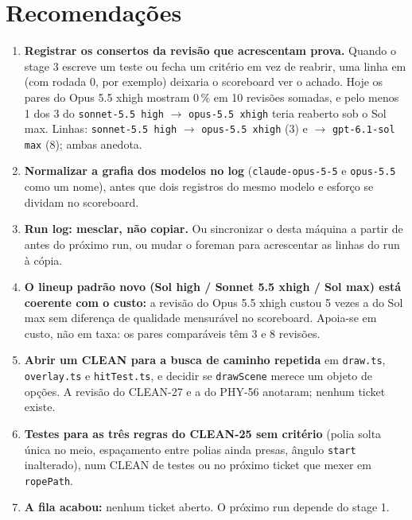 \documentclass[11pt,a4paper]{article}
\begin{document}
\section{Recomendações}
\begin{enumerate}
  \item \textbf{Registrar os consertos da revisão que acrescentam prova.}
        Quando o stage 3 escreve um teste ou fecha um critério em vez de
        reabrir, uma linha em  (com rodada 0, por
        exemplo) deixaria o scoreboard ver o achado. Hoje os pares do Opus 5.5
        xhigh mostram 0\,\% em 10 revisões somadas, e pelo menos 1 dos 3 do
        \texttt{sonnet-5.5 high} $\to$ \texttt{opus-5.5 xhigh} teria reaberto
        sob o Sol max. Linhas: \texttt{sonnet-5.5 high} $\to$
        \texttt{opus-5.5 xhigh} (3) e $\to$ \texttt{gpt-6.1-sol max} (8);
        ambas anedota.
  \item \textbf{Normalizar a grafia dos modelos no log} (\texttt{claude-opus-5-5}
        e \texttt{opus-5.5} como um nome), antes que dois registros do mesmo
        modelo e esforço se dividam no scoreboard.
  \item \textbf{Run log: mesclar, não copiar.} Ou sincronizar o
         desta máquina a partir de
         antes do próximo run, ou mudar o
        foreman para acrescentar as linhas do run à cópia.
  \item \textbf{O lineup padrão novo (Sol high / Sonnet 5.5 xhigh / Sol max)
        está coerente com o custo:} a revisão do Opus 5.5 xhigh custou 5 vezes
        a do Sol max sem diferença de qualidade mensurável no scoreboard.
        Apoia-se em custo, não em taxa: os pares comparáveis têm 3 e 8
        revisões.
  \item \textbf{Abrir um CLEAN para a busca de caminho repetida} em
        \texttt{draw.ts}, \texttt{overlay.ts} e \texttt{hitTest.ts}, e decidir
        se \texttt{drawScene} merece um objeto de opções. A revisão do CLEAN-27
        e a do PHY-56 anotaram; nenhum ticket existe.
  \item \textbf{Testes para as três regras do CLEAN-25 sem critério} (polia
        solta única no meio, espaçamento entre polias ainda presas, ângulo
        \texttt{start} inalterado), num CLEAN de testes ou no próximo ticket
        que mexer em \texttt{ropePath}.
  \item \textbf{A fila acabou:} nenhum ticket aberto. O próximo run depende do
        stage 1.
\end{enumerate}
\end{document}
